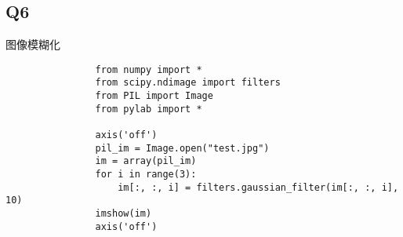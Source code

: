 \documentclass{article}
\begin{document}
        \subsection{Q6}
        图像模糊化
            \begin{verbatim}
                from numpy import *
                from scipy.ndimage import filters
                from PIL import Image
                from pylab import *

                axis('off')
                pil_im = Image.open("test.jpg")
                im = array(pil_im)
                for i in range(3):
                    im[:, :, i] = filters.gaussian_filter(im[:, :, i], 10)
                imshow(im)
                axis('off')
            \end{verbatim}
\end{document}

